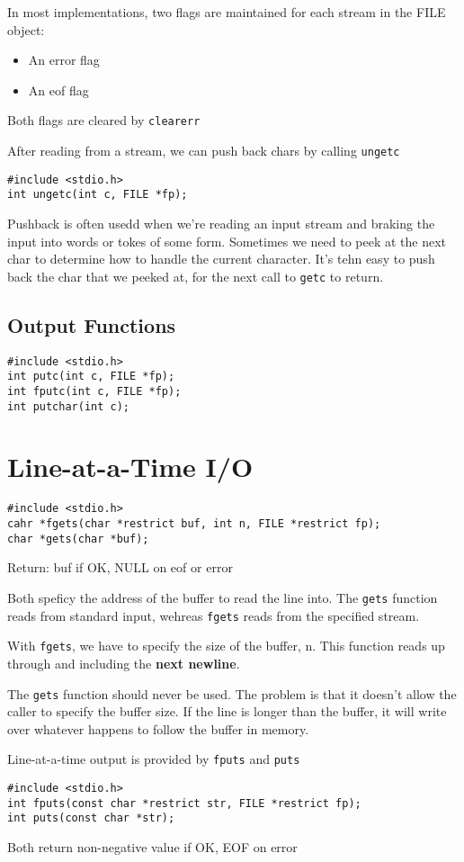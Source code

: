 \documentclass[a4paper,10pt]{book}
\begin{document}
In most implementations, two flags are maintained for each stream in the FILE
object:
\begin{itemize}
\item An error flag
\item An eof flag
\end{itemize}
Both flags are cleared by \verb|clearerr|

After reading from a stream, we can push back chars by calling \verb|ungetc|
\begin{verbatim}
#include <stdio.h>
int ungetc(int c, FILE *fp);
\end{verbatim}
Pushback is often usedd when we're reading an input stream and braking the input
into words or tokes of some form. Sometimes we need to peek at the next char to
determine how to handle the current character. It's tehn easy to push back the
char that we peeked at, for the next call to \verb|getc| to return.
\subsection{Output Functions}
\begin{verbatim}
#include <stdio.h>
int putc(int c, FILE *fp);
int fputc(int c, FILE *fp);
int putchar(int c);
\end{verbatim}
\section{Line-at-a-Time I/O}
\begin{verbatim}
#include <stdio.h>
cahr *fgets(char *restrict buf, int n, FILE *restrict fp);
char *gets(char *buf);
\end{verbatim}
Return: buf if OK, NULL on eof or error

Both speficy the address of the buffer to read the line into. The \verb|gets|
function reads from standard input, wehreas \verb|fgets| reads from the
specified stream.

With \verb|fgets|, we have to specify the size of the buffer, n. This function
reads up through and including the \textbf{next newline}.

The \verb|gets| function should never be used. The problem is that it doesn't
allow the caller to specify the buffer size. If the line is longer than the
buffer, it will write over whatever happens to follow the buffer in memory.

Line-at-a-time output is provided by \verb|fputs| and \verb|puts|
\begin{verbatim}
#include <stdio.h>
int fputs(const char *restrict str, FILE *restrict fp);
int puts(const char *str);
\end{verbatim}
Both return non-negative value if OK, EOF on error
\end{document}
